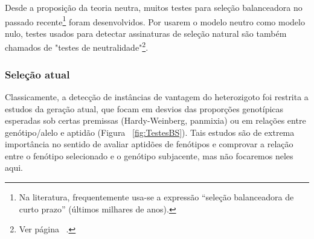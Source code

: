 \begin{refsection}



	Desde a proposição da teoria neutra, muitos testes para seleção balanceadora no passado recente\footnote{Na literatura, frequentemente usa-se a expressão \enquote{seleção balanceadora de curto prazo} (últimos milhares de anos).} foram desenvolvidos. Por usarem o modelo neutro como modelo nulo, testes usados para detectar assinaturas de seleção natural são também chamados de "testes de neutralidade"\footnote{Ver página ~\pageref{sec:Kimura}.}.

\subsubsection{Seleção atual}

    Classicamente, a detecção de instâncias de vantagem do heterozigoto foi restrita a estudos da geração atual, que focam em desvios das proporções genotípicas esperadas sob certas premissas (Hardy-Weinberg, panmixia) ou em relações entre genótipo/alelo e aptidão (Figura ~\ref{fig:TestesBS}). Tais estudos são de extrema importância no sentido de avaliar aptidões de fenótipos e comprovar a relação entre o fenótipo selecionado e o genótipo subjacente, mas não focaremos neles aqui.


\end{refsection}
